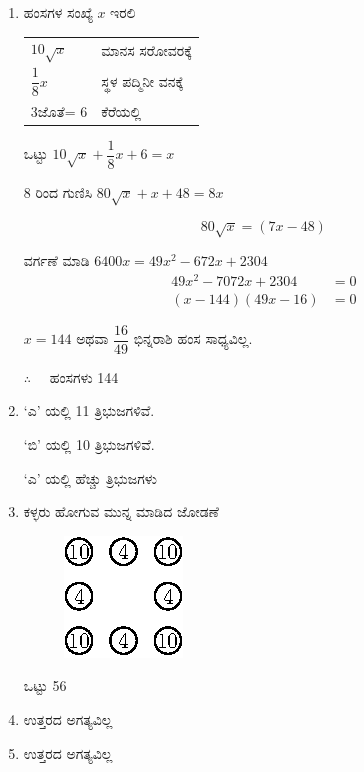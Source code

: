 \begin{enumerate}
\item ಹಂಸಗಳ ಸಂಖ್ಯೆ $x$ ಇರಲಿ 

\begin{tabular}[t]{ll}
$10 \sqrt{x}$ & ಮಾನಸ ಸರೋವರಕ್ಕೆ \\
$\dfrac{1}{8} x$ & ಸ್ಥಳ ಪದ್ಮಿನೀ ವನಕ್ಕೆ \\
$3$ಜೊತೆ= $6$ & ಕೆರೆಯಲ್ಲಿ
\end{tabular}

ಒಟ್ಟು $10\sqrt{x} + \dfrac{1}{8}x + 6 = x$

8 ರಿಂದ ಗುಣಿಸಿ $80\sqrt{x} + x + 48 = 8x$

$$80\sqrt{x} = (7x - 48)$$

ವರ್ಗಣೆ ಮಾಡಿ $6400x = 49x^{2} - 672x + 2304$
\begin{align*}
49x^{2} - 7072x + 2304 & = 0\\
(x - 144) (49x - 16) & = 0
\end{align*}
 
 $x = 144$ ಅಥವಾ $\dfrac{16}{49}$ ಭಿನ್ನರಾಶಿ ಹಂಸ ಸಾಧ್ಯವಿಲ್ಲ. 
 
 $\therefore\quad$ ಹಂಸಗಳು 144

\item `ಎ' ಯಲ್ಲಿ 11 ತ್ರಿಭುಜಗಳಿವೆ. 

`ಬಿ' ಯಲ್ಲಿ 10 ತ್ರಿಭುಜಗಳಿವೆ. 

`ಎ' ಯಲ್ಲಿ ಹೆಚ್ಚು ತ್ರಿಭುಜಗಳು 

\item ಕಳ್ಳರು ಹೋಗುವ ಮುನ್ನ ಮಾಡಿದ ಜೋಡಣೆ 
\begin{figure}[H]
\centering
\includegraphics{images/chap12/ans28.eps}
\end{figure} 

ಒಟ್ಟು 56

\item ಉತ್ತರದ ಅಗತ್ಯವಿಲ್ಲ 

\item ಉತ್ತರದ ಅಗತ್ಯವಿಲ್ಲ 
\end{enumerate}
